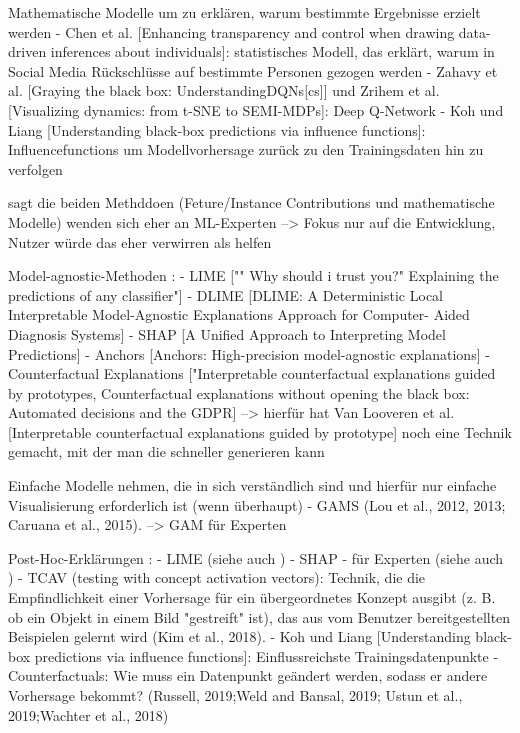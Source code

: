 Mathematische Modelle \cite{zhou20182d} um zu erklären, warum bestimmte Ergebnisse erzielt werden
- Chen et al. [Enhancing transparency and control when
drawing data-driven inferences about individuals]: statistisches Modell, das erklärt, warum in Social Media Rückschlüsse auf bestimmte Personen gezogen werden
- Zahavy et al. [Graying the black box: UnderstandingDQNs[cs]] und Zrihem et al. [Visualizing dynamics: from t-SNE to SEMI-MDPs]: Deep Q-Network
- Koh und Liang [Understanding black-box predictions via influence functions]: Influencefunctions um Modellvorhersage zurück zu den Trainingsdaten hin zu verfolgen

\cite{zhou20182d} sagt die beiden Methddoen (Feture/Instance Contributions und mathematische Modelle) wenden sich eher an ML-Experten --> Fokus nur auf die Entwicklung, Nutzer würde das eher verwirren als helfen

Model-agnostic-Methoden \cite{tsiakmaki2021case}:
- LIME ["" Why should i trust you?" Explaining the predictions of any classifier"]
- DLIME [DLIME: A Deterministic Local Interpretable Model-Agnostic Explanations Approach for Computer-
Aided Diagnosis Systems]
- SHAP [A Unified Approach to Interpreting Model Predictions]
- Anchors [Anchors: High-precision model-agnostic explanations]
- Counterfactual Explanations ["Interpretable counterfactual
explanations guided by prototypes, Counterfactual explanations without opening the black box: Automated decisions and the GDPR] --> hierfür hat Van Looveren et al. [Interpretable counterfactual explanations guided by prototype] noch eine Technik gemacht, mit der man die schneller generieren kann 

Einfache Modelle nehmen, die in sich verständlich sind und hierfür nur einfache Visualisierung erforderlich ist (wenn überhaupt) \cite{vaughan2020human}
- GAMS (Lou et al., 2012, 2013; Caruana et al., 2015). --> GAM für Experten

Post-Hoc-Erklärungen \cite{vaughan2020human}:
- LIME (siehe auch \cite{schoeffer2022human})
- SHAP - für Experten (siehe auch \cite{schoeffer2022human})
- TCAV (testing with concept activation vectors): Technik, die die Empfindlichkeit einer Vorhersage für ein übergeordnetes Konzept ausgibt (z. B. ob ein Objekt in einem Bild "gestreift" ist), das aus vom Benutzer bereitgestellten Beispielen gelernt wird (Kim et al., 2018).
- Koh und Liang [Understanding black-box predictions via influence functions]: Einflussreichste Trainingsdatenpunkte
- Counterfactuals: Wie muss ein Datenpunkt geändert werden, sodass er andere Vorhersage bekommt? (Russell, 2019;Weld and Bansal, 2019; Ustun et al., 2019;Wachter et al., 2018)

